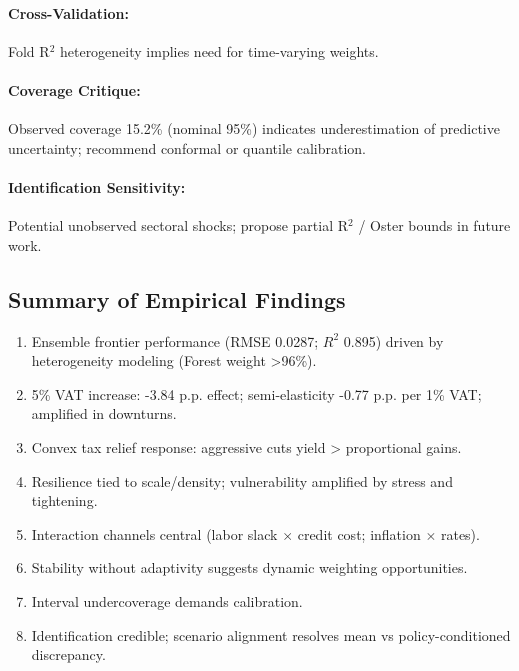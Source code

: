 \paragraph{Cross-Validation:} Fold R$^2$ heterogeneity implies need for time-varying weights.
\paragraph{Coverage Critique:} Observed coverage 15.2\% (nominal 95\%) indicates underestimation of predictive uncertainty; recommend conformal or quantile calibration.
\paragraph{Identification Sensitivity:} Potential unobserved sectoral shocks; propose partial R$^2$ / Oster bounds in future work.

\subsection{Summary of Empirical Findings}
\begin{enumerate}
  \item Ensemble frontier performance (RMSE 0.0287; $R^2$ 0.895) driven by heterogeneity modeling (Forest weight >96\%).
  \item 5\% VAT increase: -3.84 p.p. effect; semi-elasticity -0.77 p.p. per 1\% VAT; amplified in downturns.
  \item Convex tax relief response: aggressive cuts yield > proportional gains.
  \item Resilience tied to scale/density; vulnerability amplified by stress and tightening.
  \item Interaction channels central (labor slack $\times$ credit cost; inflation $\times$ rates).
  \item Stability without adaptivity suggests dynamic weighting opportunities.
  \item Interval undercoverage demands calibration.
  \item Identification credible; scenario alignment resolves mean vs policy-conditioned discrepancy.
\end{enumerate}
